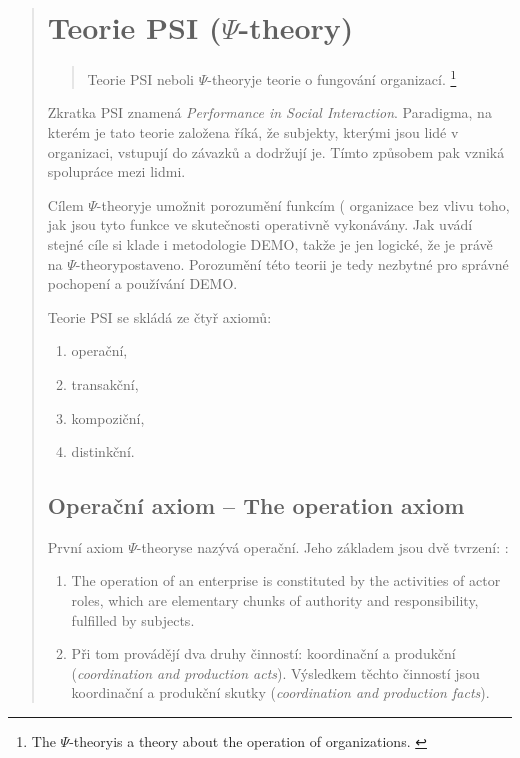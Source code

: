 \documentclass[]{article}
\newcommand{\ptheory}{$\Psi$-theory}
\begin{document}
\begin{quote}
\section{Teorie PSI ($\Psi$-theory)}

\begin{quote}
Teorie PSI neboli \ptheory  je teorie o fungování organizací. \cite{Dietz2005}
\footnote{The \ptheory is a theory about the operation of organizations. \cite{Dietz2005}}
\end{quote}

Zkratka PSI znamená \textit{Performance in Social Interaction}. Paradigma, na kterém je tato teorie založena říká, že subjekty, kterými jsou lidé v organizaci, vstupují do závazků a dodržují je. Tímto způsobem pak vzniká spolupráce mezi lidmi. %

Cílem \ptheory je umožnit porozumění funkcím (%
organizace bez vlivu toho, jak jsou tyto funkce ve skutečnosti operativně vykonávány. Jak uvádí \cite{Vejrazkova2013} stejné cíle si klade i metodologie DEMO, takže je jen logické, že je právě na \ptheory postaveno. Porozumění této teorii je tedy nezbytné pro správné pochopení a používání DEMO.

Teorie PSI se skládá ze čtyř axiomů:

\begin{enumerate}
\item operační,
\item transakční,
\item kompoziční,
\item distinkční.
\end{enumerate}

\subsection{Operační axiom – The operation axiom}
První axiom \ptheory se nazývá operační. Jeho základem jsou dvě tvrzení: \cite{Dietz2006}:

\begin{enumerate}
\item The operation of an enterprise is constituted by the activities of actor roles, which are elementary chunks of authority and responsibility, fulfilled by subjects. %
\item Při tom provádějí dva druhy činností: koordinační a produkční (\textit{coordination and production acts}). Výsledkem těchto činností jsou koordinační a produkční skutky (\textit{coordination and production facts}).
\end{enumerate}


\end{quote}
\end{document}
